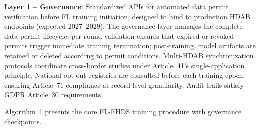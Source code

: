 \documentclass[conference,letterpaper]{IEEEtran}
\begin{document}
\textbf{Layer 1 -- Governance}: Standardized APIs for automated data permit verification before FL training initiation, designed to bind to production HDAB endpoints (expected 2027--2029). The governance layer manages the complete data permit lifecycle: per-round validation ensures that expired or revoked permits trigger immediate training termination; post-training, model artifacts are retained or deleted according to permit conditions. Multi-HDAB synchronization protocols coordinate cross-border studies under Article~41's single-application principle. National opt-out registries are consulted before each training epoch, ensuring Article~71 compliance at record-level granularity. Audit trails satisfy GDPR Article~30 requirements.

Algorithm~1 presents the core FL-EHDS training procedure with governance checkpoints.
\end{document}
